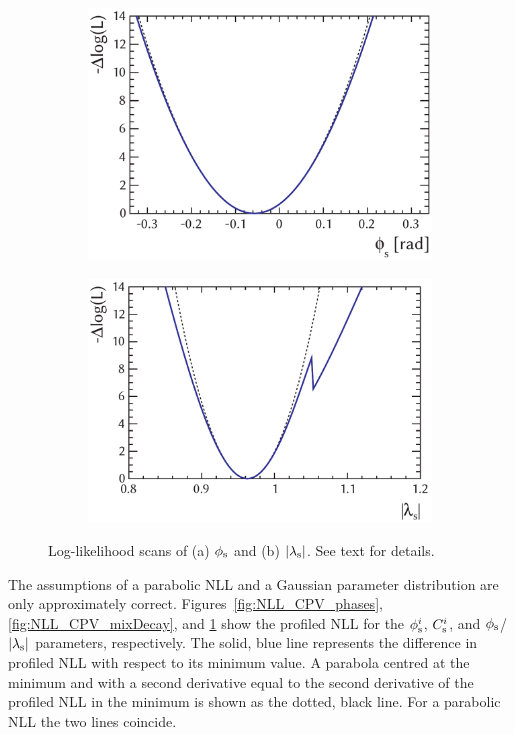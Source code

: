 \begin{figure}[tbp]
  \centering
  \begin{subfigure}{0.49\textwidth}
    \includegraphics[width=\textwidth]{graphics/results/NLL_lamb_phi_phiCP}
    \caption{}
  \end{subfigure}
  \hfill%
  \begin{subfigure}{0.49\textwidth}
    \includegraphics[width=\textwidth]{graphics/results/NLL_lamb_phi_lambdaCP}
    \caption{}
  \end{subfigure}

  \caption{Log-likelihood scans of (a) $\phi_\text{s}$ and (b) $|{\lambda_{\text{s}}}|$. See text for details.}
  \label{fig:NLL_CPV_phisLamsAbs}
\end{figure}

The assumptions of a parabolic NLL and a Gaussian parameter distribution are only approximately correct. Figures~\ref{fig:NLL_CPV_phases},
\ref{fig:NLL_CPV_mixDecay}, and \ref{fig:NLL_CPV_phisLamsAbs} show the profiled NLL for the $\phi_\text{s}^{i}$, $C_\text{s}^{i}$, and $\phi_\text{s}$/$|{\lambda_{\text{s}}}|$
parameters, respectively. The solid, blue line represents the difference in profiled NLL with respect to its minimum value. A parabola
centred at the minimum and with a second derivative equal to the second derivative of the profiled NLL in the minimum is shown as the
dotted, black line. For a parabolic NLL the two lines coincide.


